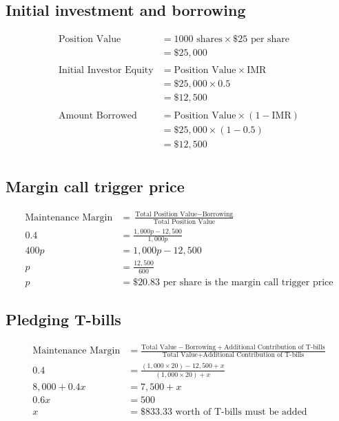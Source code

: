 \documentclass[12pt]{article}
\begin{document}
\section{}
\subsection{Initial investment and borrowing}
\begin{align*}
	\text{Position Value} &= 1000 \text{ shares} \times \$25 \text{ per share}\\
	&= \$25,000\\
	&\\
	\text{Initial Investor Equity} &= \text{Position Value} \times \text{IMR}\\
	&= \$25,000 \times 0.5\\
	&= \$12,500\\
	&\\
	\text{Amount Borrowed} &= \text{Position Value} \times (1-\text{IMR})\\
	&= \$25,000 \times (1-0.5)\\
	&= \$12,500\\
\end{align*}

\subsection{Margin call trigger price}
\begin{align*}
	\text{Maintenance Margin} &=  \frac{\text{Total Position Value} - \text{Borrowing}}{\text{Total Position Value}} \\
	0.4 &= \frac{1,000p - 12,500}{1,000p}\\
	400p &= 1,000p-12,500\\
	p &= \frac{12,500}{600}\\
	p &= \$20.83 \text{ per share is the margin call trigger price} 
\end{align*}

\subsection{Pledging T-bills}
\begin{align*}
	\text{Maintenance Margin} &=  \frac{\text{Total Value} - \text{Borrowing} + \text{Additional Contribution of T-bills}}{\text{Total Value}+ \text{Additional Contribution of T-bills}} \\
	0.4 &= \frac{(1,000\times20) - 12,500 + x}{(1,000\times20)+x} \\
	8,000 + 0.4x &= 7,500 + x\\
	0.6x &= 500\\
	x &= \$833.33 \text{ worth of T-bills must be added}\\
\end{align*}
\end{document}

